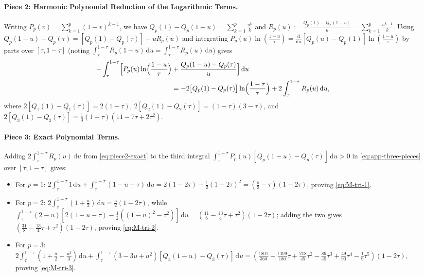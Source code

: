 \documentclass[11pt,reqno]{amsart}
\theoremstyle{definition}
\theoremstyle{remark}
\numberwithin{equation}{section}
\newcommand{\dd}{\mathrm{d}}
\begin{document}
\paragraph{\textbf{Piece 2: Harmonic Polynomial Reduction of the Logarithmic Terms.}}
Writing $P_p(v) = \sum_{k=1}^p (1-v)^{k-1}$, we have $Q_p(1) - Q_p(1-u) = \sum_{k=1}^p \frac{u^k}{k}$ and $R_p(u) := \frac{Q_p(1)-Q_p(1-u)}{u} = \sum_{k=1}^p \frac{u^{k-1}}{k}$. Using $Q_p(1-u)-Q_p(\tau) = [Q_p(1)-Q_p(\tau)] - u R_p(u)$ and integrating $P_p(u)\ln(\frac{1-u}{\tau}) = \frac{\dd}{\dd u}[Q_p(u)-Q_p(1)]\ln(\frac{1-u}{\tau})$ by parts over $[\tau,1-\tau]$ (noting $\int_\tau^{1-\tau} R_p(1-u)\,\dd u = \int_\tau^{1-\tau} R_p(u)\,\dd u$) gives
\begin{equation}\label{eq:piece2-exact}
\begin{aligned}
-\int_{\tau}^{1-\tau} \Bigl[P_p(u)\ln\Bigl(\frac{1-u}{\tau}\Bigr) &+ \frac{Q_p(1-u) - Q_p(\tau)}{u}\Bigr]\,\dd u \\
&= -2\bigl[Q_p(1)-Q_p(\tau)\bigr]\ln\Bigl(\frac{1-\tau}{\tau}\Bigr) + 2\int_{\tau}^{1-\tau} R_p(u)\,\dd u,
\end{aligned}
\end{equation}
where $2[Q_1(1)-Q_1(\tau)] = 2(1-\tau)$, $2[Q_2(1)-Q_2(\tau)] = (1-\tau)(3-\tau)$, and $2[Q_3(1)-Q_3(\tau)] = \frac{1}{3}(1-\tau)(11 - 7\tau + 2\tau^2)$.

\paragraph{\textbf{Piece 3: Exact Polynomial Terms.}}
Adding $2\int_\tau^{1-\tau} R_p(u)\,\dd u$ from \eqref{eq:piece2-exact} to the third integral $\int_\tau^{1-\tau} P_p(u)[Q_p(1-u)-Q_p(\tau)]\,\dd u > 0$ in \eqref{eq:app-three-pieces} over $[\tau,1-\tau]$ gives:
\begin{itemize}[leftmargin=1.8em]
\item For $p=1$: $2\int_\tau^{1-\tau} 1\,\dd u + \int_\tau^{1-\tau} (1-u-\tau)\,\dd u = 2(1-2\tau) + \frac{1}{2}(1-2\tau)^2 = (\frac{5}{2} - \tau)(1-2\tau)$, proving \eqref{eq:M-tri-1}.
\item For $p=2$: $2\int_\tau^{1-\tau}(1+\frac{u}{2})\,\dd u = \frac{5}{2}(1-2\tau)$, while $\int_\tau^{1-\tau}(2-u)[2(1-u-\tau) - \frac{1}{2}((1-u)^2-\tau^2)]\,\dd u = (\frac{11}{8} - \frac{13}{4}\tau + \tau^2)(1-2\tau)$; adding the two gives $(\frac{31}{8} - \frac{13}{4}\tau + \tau^2)(1-2\tau)$, proving \eqref{eq:M-tri-2}.
\item For $p=3$: $2\int_\tau^{1-\tau}(1+\frac{u}{2}+\frac{u^2}{3})\,\dd u + \int_\tau^{1-\tau}(3-3u+u^2)[Q_3(1-u)-Q_3(\tau)]\,\dd u = (\frac{1801}{360} - \frac{1199}{180}\tau + \frac{218}{45}\tau^2 - \frac{89}{45}\tau^3 + \frac{49}{90}\tau^4 - \frac{1}{9}\tau^5)(1-2\tau)$, proving \eqref{eq:M-tri-3}.
\end{itemize}
\end{document}
